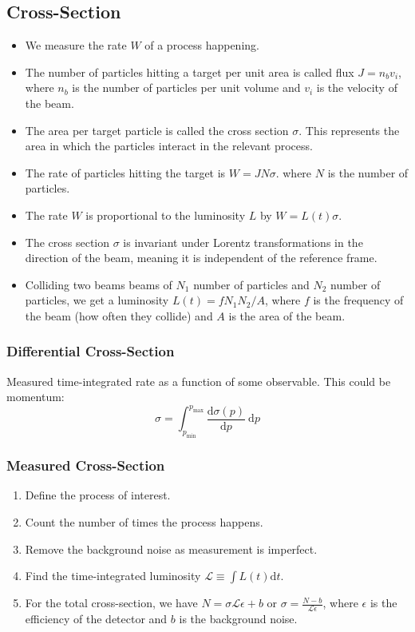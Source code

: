 \subsection{Cross-Section}
\begin{itemize}
    \item We measure the rate $W$ of a process happening. 
    \item The number of particles hitting a target per unit area is called flux $J = n_{b} v_i$, where $n_{b}$ is the number of particles per unit volume and $v_i$ is the velocity of the beam. 
    \item The area per target particle is called the cross section $σ$. This represents the area in which the particles interact in the relevant process.
    \item The rate of particles hitting the target is $W = JNσ$. where $N$ is the number of particles. 
    \item The rate $W$ is proportional to the luminosity $L$ by $W = L(t)σ$. 
    \item The cross section $σ$ is invariant under Lorentz transformations in the direction of the beam, meaning it is independent of the reference frame. 
    \item Colliding two beams beams of $N_1$ number of particles and $N_2$ number of particles, we get a luminosity $L(t) = f N_1 N_2 / A$, where $f$ is the frequency of the beam (how often they collide) and $A$ is the area of the beam.
\end{itemize}

\subsubsection{Differential Cross-Section}
Measured time-integrated rate as a function of some observable. This could be momentum: 
\begin{equation}
    σ = ∫_{p_{\text{min}}}^{p_{\text{max}}} \frac{\mathrm{d}σ(p)}{\mathrm{d}p} \ \mathrm{d}p
\end{equation}

\subsubsection{Measured Cross-Section}
\begin{enumerate}
    \item Define the process of interest. 
    \item Count the number of times the process happens.
    \item Remove the background noise as measurement is imperfect. 
    \item Find the time-integrated luminosity $\mathcal{L} ≡ ∫  L(t) \mathrm{d}t$. 
    \item For the total cross-section, we have $N = σ \mathcal{L}ϵ + b$ or $\displaystyle σ = \frac{N - b}{\mathcal{L}ϵ}$, where $ϵ$ is the efficiency of the detector and $b$ is the background noise.
\end{enumerate}

